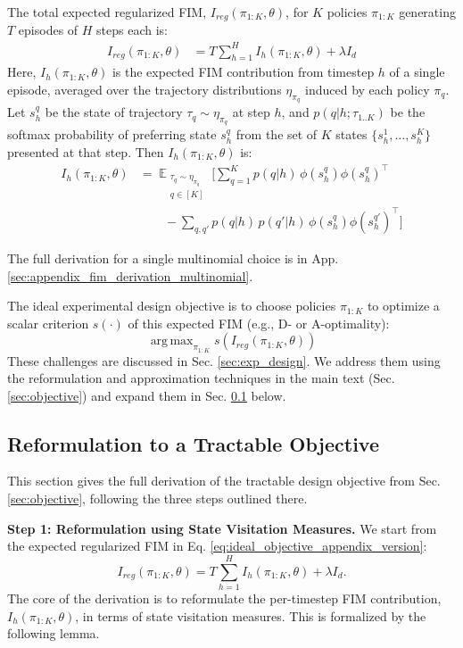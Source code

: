 \documentclass{article}
\DeclareMathOperator*{\E}{\mathbb{E}} %
\DeclareMathOperator*{\argmax}{arg\,max}
\begin{document}
The total expected regularized FIM, $I_{reg}(\pi_{1:K}, \theta)$, for $K$ policies $\pi_{1:K}$ generating $T$ episodes of $H$ steps each is:
\begin{align*}
I_{reg}(\pi_{1:K}, \theta)
&= T \sum_{h=1}^H I_h(\pi_{1:K}, \theta) + \lambda I_d
\end{align*}
Here, $I_h(\pi_{1:K}, \theta)$ is the expected FIM contribution from timestep $h$ of a single episode, averaged over the trajectory distributions $\eta_{\pi_q}$ induced by each policy $\pi_q$. Let $s^q_h$ be the state of trajectory $\tau_q \sim \eta_{\pi_q}$ at step $h$, and $p(q|h; \tau_{1..K})$ be the softmax probability of preferring state $s^q_h$ from the set of $K$ states $\{s^1_h, \dots, s^K_h\}$ presented at that step. Then $I_h(\pi_{1:K}, \theta)$ is:
\begin{align*}
I_h(\pi_{1:K}, \theta)
&= \E_{\substack{\tau_q \sim \eta_{\pi_q} \\ q \in [K]}} \Bigg[
\sum_{q=1}^K p(q|h)\, \phi(s^q_{h})\phi(s^q_{h})^\top \\
&\qquad - \sum_{q,q'} p(q|h)\, p(q'|h)\, \phi(s^q_{h})\phi(s^{q'}_{h})^\top
\Bigg]
\end{align*}

The full derivation for a single multinomial choice is in App. \ref{sec:appendix_fim_derivation_multinomial}.

The ideal experimental design objective is to choose policies $\pi_{1:K}$ to optimize a scalar criterion $s(\cdot)$ of this expected FIM (e.g., D- or A-optimality):
\begin{equation}
\argmax_{\pi_{1:K}} s\left( I_{reg}(\pi_{1:K}, \theta) \right) \label{eq:ideal_objective_appendix_version}
\end{equation}
These challenges are discussed in Sec. \ref{sec:exp_design}. We address them using the reformulation and approximation techniques in the main text (Sec. \ref{sec:objective}) and expand them in Sec. \ref{sec:appendix_reformulation_tractable_objective} below.

\subsection{Reformulation to a Tractable Objective}
\label{sec:appendix_reformulation_tractable_objective}
This section gives the full derivation of the tractable design objective from Sec. \ref{sec:objective}, following the three steps outlined there.

\textbf{Step 1: Reformulation using State Visitation Measures.}
We start from the expected regularized FIM in Eq. \ref{eq:ideal_objective_appendix_version}:
\[
I_{reg}(\pi_{1:K}, \theta) = T \sum_{h=1}^H I_h(\pi_{1:K}, \theta) + \lambda I_d.
\]
The core of the derivation is to reformulate the per-timestep FIM contribution, $I_h(\pi_{1:K}, \theta)$, in terms of state visitation measures. This is formalized by the following lemma.
\end{document}
